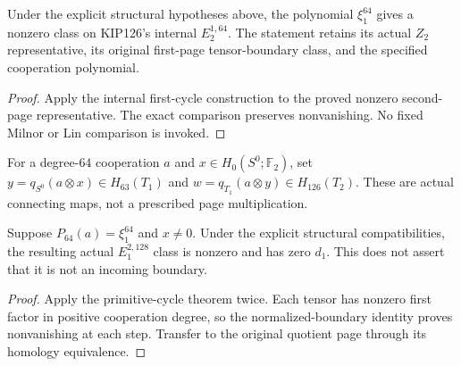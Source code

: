 \begin{proposition}
  \label{prop:h6-nonzero-internal-second-page}
  \leanok
  Under the explicit structural hypotheses above, the polynomial
  $\xi_1^{64}$ gives a nonzero class on KIP126's internal $E_2^{1,64}$.
  The statement retains its actual $Z_2$ representative, its original
  first-page tensor-boundary class, and the specified cooperation polynomial.
\end{proposition}
\begin{proof}
  Apply the internal first-cycle construction to the proved nonzero
  second-page representative. The exact comparison preserves nonvanishing.
  No fixed Milnor or Lin comparison is invoked.
  \leanok
\end{proof}

\begin{definition}
  \label{def:h6-double-tensor-representative}
  \leanok
  For a degree-$64$ cooperation $a$ and $x\in H_0(S^0;\mathbb F_2)$,
  set $y=q_{S^0}(a\otimes x)\in H_{63}(T_1)$ and
  $w=q_{T_1}(a\otimes y)\in H_{126}(T_2)$.
  These are actual connecting maps, not a prescribed page multiplication.
\end{definition}

\begin{proposition}
  \label{prop:h6-double-first-cycle}
  \leanok
  Suppose $P_{64}(a)=\xi_1^{64}$ and $x\ne0$. Under the explicit structural
  compatibilities, the resulting actual $E_1^{2,128}$ class is nonzero
  and has zero $d_1$. This does not assert that it is not an incoming boundary.
\end{proposition}
\begin{proof}
  Apply the primitive-cycle theorem twice. Each tensor has nonzero first
  factor in positive cooperation degree, so the normalized-boundary
  identity proves nonvanishing at each step. Transfer to the original
  quotient page through its homology equivalence.
  \leanok
\end{proof}

